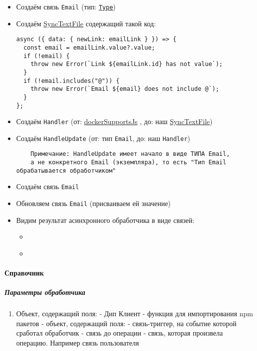 \documentclass{article}
\begin{document}
\begin{itemize}
  \item Создаём связь \texttt{Email} (тип: \texttt{\hyperlink{Core.Type.Description}{Type}})
  \item Создаём \hyperlink{Core.SyncTextFile.Description}{SyncTextFile} содержащий такой
        код:
        \begin{lstlisting}
async ({ data: { newLink: emailLink } }) => {
  const email = emailLink.value?.value;
  if (!email) {
    throw new Error(`Link ${emailLink.id} has not value`);
  }
  if (!email.includes("@")) {
    throw new Error(`Email ${email} does not include @`);
  }
};
\end{lstlisting}
  \item Создаём \texttt{Handler} (от:
        \hyperlink{Core.dockerSupportsJs.Description}{dockerSupportsJs} , до: наш
        \hyperlink{Core.SyncTextFile.Description}{SyncTextFile})
  \item Создаём \texttt{HandleUpdate} (от: тип \texttt{Email}, до: наш
        \texttt{Handler})
        \begin{verbatim}
    Примечание: HandleUpdate имеет начало в виде ТИПА Email,
    а не конкретного Email (экземпляра), то есть "Тип Email обрабатывается обработчиком"
    \end{verbatim}
  \item Создаём связь \texttt{Email}
  \item Обновляем связь \texttt{Email} (присваиваем ей значение)
  \item Видим результат асинхронного обработчика в виде связей:
        \begin{itemize}
          \item \begin{handler_success_result_info}
                \end{handler_success_result_info}\\

          \item \begin{handler_fail_result_info}
                \end{handler_fail_result_info}\\
        \end{itemize}
\end{itemize}

\paragraph{Справочник}
\subparagraph{Параметры обработчика}
\begin{enumerate}
  \item Объект, содержащий поля:
         - Дип Клиент
         - функция для импортирования npm пакетов
         - объект, содержащий поля:
         - связь-триггер, на событие которой сработал
        обработчик
         - связь до операции
         - связь, которая произвела операцию.
        Например связь пользователя
\end{enumerate}
\end{document}
